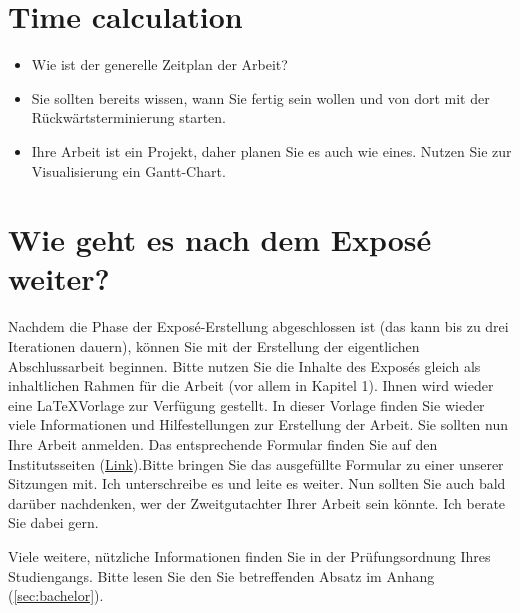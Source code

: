 \documentclass[pdftex,a4paper,12pt]{scrartcl}
\begin{document}
\section{Time calculation}
\begin{itemize}
	\item Wie ist der generelle Zeitplan der Arbeit? 
	\item Sie sollten bereits wissen, wann Sie fertig sein wollen und von dort mit der Rückwärtsterminierung starten.
	\item Ihre Arbeit ist ein Projekt, daher planen Sie es auch wie eines. Nutzen Sie zur Visualisierung ein Gantt-Chart.
\end{itemize}

\section{Wie geht es nach dem Exposé weiter?}

Nachdem die Phase der Exposé-Erstellung abgeschlossen ist (das kann bis zu drei Iterationen dauern), können Sie mit der Erstellung der eigentlichen Abschlussarbeit beginnen. Bitte nutzen Sie die Inhalte des Exposés gleich als inhaltlichen Rahmen für die Arbeit (vor allem in Kapitel 1). Ihnen wird wieder eine \LaTeX Vorlage zur Verfügung gestellt. In dieser Vorlage finden Sie wieder viele Informationen und Hilfestellungen zur Erstellung der Arbeit. Sie sollten nun Ihre Arbeit anmelden. Das entsprechende Formular finden Sie auf den Institutsseiten (\href{http://www.mi.fu-berlin.de/inf/stud-bioinf/downloads/Anmeldung_zur_Bachelorarbeit_2010.pdf}{Link}).Bitte bringen Sie das ausgefüllte Formular zu einer unserer Sitzungen mit. Ich unterschreibe es und leite es weiter. Nun sollten Sie auch bald darüber nachdenken, wer der Zweitgutachter Ihrer Arbeit sein könnte. Ich berate Sie dabei gern. 

Viele weitere, nützliche Informationen finden Sie in der Prüfungsordnung Ihres Studiengangs. Bitte lesen Sie den Sie betreffenden Absatz im Anhang (\ref{sec:bachelor}). 
\newpage
{}
{}   %
\end{document}

